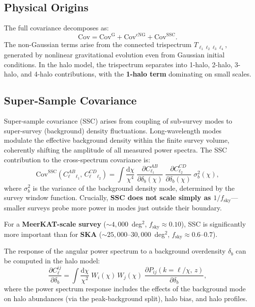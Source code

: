 \documentclass[10pt,a4paper]{article}
\newcommand{\Cl}{C_\ell}
\newcommand{\fsky}{f_{\mathrm{sky}}}
\begin{document}
\subsection{Physical Origins}

The full covariance decomposes as:
\begin{equation}
\mathrm{Cov} = \mathrm{Cov}^{\mathrm{G}} + \mathrm{Cov}^{\mathrm{cNG}} + \mathrm{Cov}^{\mathrm{SSC}}.
\end{equation}
The non-Gaussian terms arise from the connected trispectrum $T_{\ell_1\ell_2\ell_3\ell_4}$, generated by nonlinear gravitational evolution even from Gaussian initial conditions. In the halo model, the trispectrum separates into 1-halo, 2-halo, 3-halo, and 4-halo contributions, with the \textbf{1-halo term} dominating on small scales.


\subsection{Super-Sample Covariance}

Super-sample covariance (SSC) arises from coupling of sub-survey modes to super-survey (background) density fluctuations. Long-wavelength modes modulate the effective background density within the finite survey volume, coherently shifting the amplitude of all measured power spectra. The SSC contribution to the cross-spectrum covariance is:
\begin{equation}
\mathrm{Cov}^{\mathrm{SSC}}(\Cl^{AB}_{\ell_1},\, \Cl^{CD}_{\ell_2})
= \int \frac{\mathrm{d}\chi}{\chi^4}\;
\frac{\partial C_{\ell_1}^{AB}}{\partial \delta_b(\chi)}\;
\frac{\partial C_{\ell_2}^{CD}}{\partial \delta_b(\chi)}\;
\sigma_b^2(\chi),
\label{eq:ssc}
\end{equation}
where $\sigma_b^2$ is the variance of the background density mode, determined by the survey window function. Crucially, \textbf{SSC does not scale simply as $1/\fsky$}---smaller surveys probe more power in modes just outside their boundary.

For a \textbf{MeerKAT-scale survey} ($\sim 4{,}000$~deg$^2$, $\fsky \approx 0.10$), SSC is significantly more important than for \textbf{SKA} ($\sim 25{,}000$--$30{,}000$~deg$^2$, $\fsky \approx 0.6$--$0.7$).

The response of the angular power spectrum to a background overdensity $\delta_b$ can be computed in the halo model:
\begin{equation}
\frac{\partial \Cl^{ij}}{\partial \delta_b}
= \int \frac{\mathrm{d}\chi}{\chi^2}\; W_i(\chi)\, W_j(\chi)\;
\frac{\partial P_{ij}(k{=}\ell/\chi,\, z)}{\partial \delta_b},
\end{equation}
where the power spectrum response includes the effects of the background mode on halo abundances (via the peak-background split), halo bias, and halo profiles.
\end{document}

